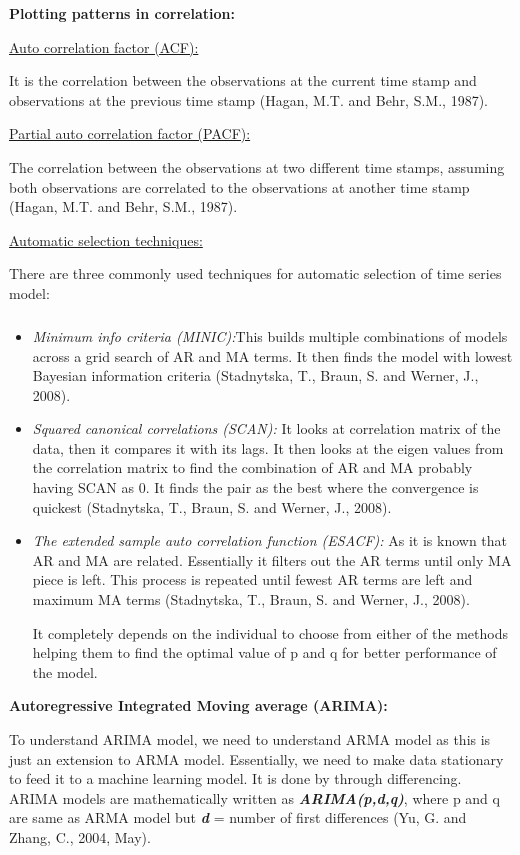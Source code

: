 \documentclass[12pt,a4paper]{book}
\begin{document}
{\textbf{Plotting patterns in correlation:}

\uline{Auto correlation factor (ACF):}

It is the correlation between the observations at the current time stamp
and observations at the previous time stamp (Hagan, M.T. and Behr, S.M.,
1987).

\uline{Partial auto correlation factor (PACF):}

The correlation between the observations at two different time stamps,
assuming both observations are correlated to the observations at another
time stamp (Hagan, M.T. and Behr, S.M., 1987).

\uline{Automatic selection techniques:}

There are three commonly used techniques for automatic selection of time
series model:

\hypertarget{section}{%
\subparagraph{}\label{section}}

\begin{itemize}
\item
  \emph{Minimum info criteria (MINIC):}This builds multiple combinations
  of models across a grid search of AR and MA terms. It then finds the
  model with lowest Bayesian information criteria (Stadnytska, T.,
  Braun, S. and Werner, J., 2008).
\item
  \emph{Squared canonical correlations (SCAN):} It looks at correlation
  matrix of the data, then it compares it with its lags. It then looks
  at the eigen values from the correlation matrix to find the
  combination of AR and MA probably having SCAN as 0. It finds the pair
  as the best where the convergence is quickest (Stadnytska, T., Braun,
  S. and Werner, J., 2008).
\item
  \emph{The extended sample auto correlation function (ESACF):} As it is
  known that AR and MA are related. Essentially it filters out the AR
  terms until only MA piece is left. This process is repeated until
  fewest AR terms are left and maximum MA terms (Stadnytska, T., Braun,
  S. and Werner, J., 2008).

  It completely depends on the individual to choose from either of the
  methods helping them to find the optimal value of p and q for better
  performance of the model.
\end{itemize}

\textbf{Autoregressive Integrated Moving average (ARIMA):}

To understand ARIMA model, we need to understand ARMA model as this is
just an extension to ARMA model. Essentially, we need to make data
stationary to feed it to a machine learning model. It is done by through
differencing. ARIMA models are mathematically written as
\textbf{\emph{ARIMA(p,d,q)}}, where p and q are same as ARMA model but
\textbf{\emph{d}} = number of first differences (Yu, G. and Zhang, C.,
2004, May).

}
\end{document}
